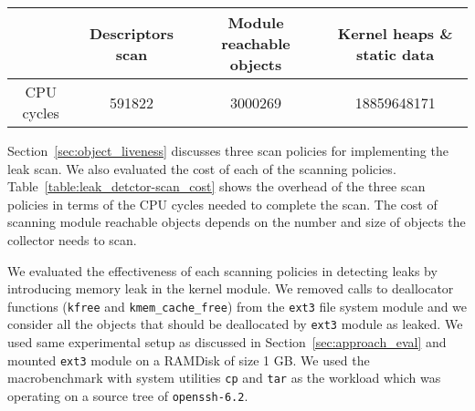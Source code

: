 \begin{table*}
\begin{center}
\begin{tabular}{|c|c|c|c|}
  \hline
  & Descriptors scan & Module reachable objects & Kernel heaps \& static data\\
  \hline
   CPU cycles & 591822 & 3000269 & 18859648171\\
  \hline
\end{tabular}
\caption[Performance impact of leak scan policies on the collector thread.]{\label{table:leak_detctor-scan_cost}The cost of different scanning policies for the collector. The cost of scanning module reachable objects depends on the number and size of the objects in hash table. At the time of evaluation the hash table was having ``192'' objects with the total scan size of {\texttildelow}4Mb.}
\end{center}
\end{table*}


Section~\ref{sec:object_liveness} discusses three scan policies for implementing the leak scan. We also evaluated the cost of each of the scanning policies. Table~\ref{table:leak_detctor-scan_cost} shows the overhead of the three scan policies in terms of the CPU cycles needed to complete the scan. The cost of scanning module reachable objects depends on the number and size of objects the collector needs to scan. %

We evaluated the effectiveness of each scanning policies in detecting leaks by introducing memory leak in the kernel module. We removed calls to deallocator functions  (\texttt{kfree} and \texttt{kmem\_cache\_free}) from the \texttt{ext3} file system module and we consider all the objects that should be deallocated by \texttt{ext3} module as leaked. We used same experimental setup as discussed in Section~\ref{sec:approach_eval} and mounted \texttt{ext3} module on a RAMDisk of size 1 GB. We used the macrobenchmark with system utilities \texttt{cp} and \texttt{tar} as the workload which was operating on a source tree of \texttt{openssh-6.2}. %


